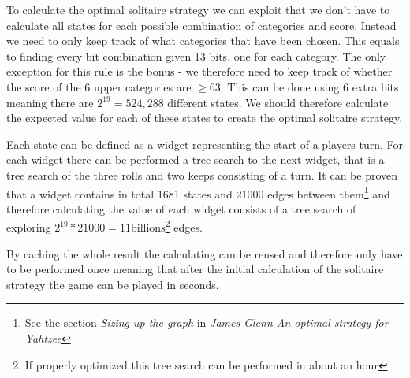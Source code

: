 To calculate the optimal solitaire strategy we can exploit that we don't have to calculate all states for each possible combination of categories and score. Instead we need to only keep track of what categories that have been chosen. This equals to finding every bit combination given 13 bits, one for each category. The only exception for this rule is the bonus - we therefore need to keep track of whether the score of the 6 upper categories are $\geq 63$. This can be done using 6 extra bits meaning there are $2^{19} = 524,288$ different states. We should therefore calculate the expected value for each of these states to create the optimal solitaire strategy.

Each state can be defined as a widget representing the start of a players turn. For each widget there can be performed a tree search to the next widget, that is a tree search of the three rolls and two keeps consisting of a turn. It can be proven that a widget contains in total 1681 states and 21000 edges between them\footnote{See the section \emph{Sizing up the graph} in \emph{James Glenn An optimal strategy for Yahtzee}\cite{glenn2006optimal}} and therefore calculating the value of each widget consists of a tree search of exploring $2^{19} * 21000 = 11\mbox{billions}$\footnote{If properly optimized this tree search can be performed in about an hour} edges. 

By caching the whole result the calculating can be reused and therefore only have to be performed once meaning that after the initial calculation of the solitaire strategy the game can be played in seconds.